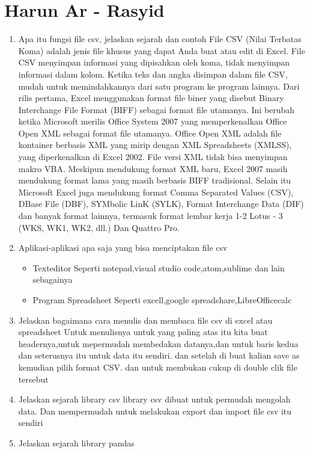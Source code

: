 ﻿\section{Harun Ar - Rasyid}
\begin{enumerate}
    \item Apa itu fungsi file csv, jelaskan sejarah dan contoh
    File CSV (Nilai Terbatas Koma) adalah jenis file khusus yang dapat Anda buat atau edit di Excel. File CSV menyimpan informasi yang dipisahkan oleh koma, tidak menyimpan informasi dalam kolom. Ketika teks dan angka disimpan dalam file CSV, mudah untuk memindahkannya dari satu program ke program lainnya.
    Dari rilis pertama, Excel menggunakan format file biner yang disebut Binary Interchange File Format (BIFF) sebagai format file utamanya. Ini berubah ketika Microsoft merilis Office System 2007 yang memperkenalkan Office Open XML sebagai format file utamanya. Office Open XML adalah file kontainer berbasis XML yang mirip dengan XML Spreadsheets (XMLSS), yang diperkenalkan di Excel 2002. File versi XML tidak bisa menyimpan makro VBA.
    Meskipun mendukung format XML baru, Excel 2007 masih mendukung format lama yang masih berbasis BIFF tradisional. Selain itu Microsoft Excel juga mendukung format Comma Separated Values (CSV), DBase File (DBF), SYMbolic LinK (SYLK), Format Interchange Data (DIF) dan banyak format lainnya, termasuk format lembar kerja 1-2 Lotus - 3 (WKS, WK1, WK2, dll.) Dan Quattro Pro.
    \item Aplikasi-aplikasi apa saja yang bisa menciptakan file csv
    \begin{itemize}
        \item Texteditor
        Seperti notepad,visual studio code,atom,sublime dan lain sebagainya
        \item Program Spreadsheet
        Seperti excell,google spreadshare,LibreOfficecalc
    \end{itemize}
    \item Jelaskan bagaimana cara menulis dan membaca file csv di excel atau spreadsheet
    Untuk menulisnya untuk yang paling atas itu kita buat headernya,untuk mepermudah membedakan datanya,dan untuk baris kedua dan seterusnya itu untuk data itu sendiri.
    dan setelah di buat kalian save as kemudian pilih format CSV.
    dan untuk membukan cukup di double clik file tersebut
    \item Jelaskan sejarah library csv
    library csv dibuat untuk permudah mengolah data. Dan mempermudah untuk melakukan export dan import file csv itu sendiri
    \item Jelaskan sejarah library pandas

\end{enumerate}
